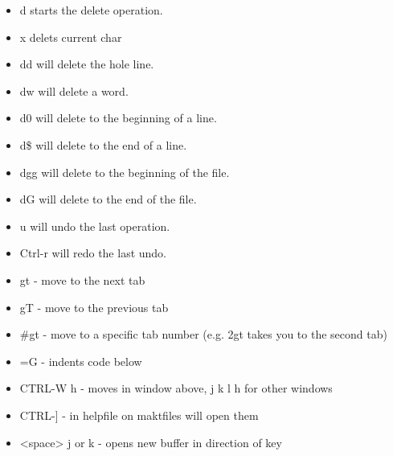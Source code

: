 \documentclass[12pt]{article}
\begin{document}
\begin{itemize}
    \item d starts the delete operation.
    \item x delets current char
    \item dd will delete the hole line.
    \item dw will delete a word.
    \item d0 will delete to the beginning of a line.
    \item d\$ will delete to the end of a line.
    \item dgg will delete to the beginning of the file.
    \item dG will delete to the end of the file.
    \item u will undo the last operation.
    \item Ctrl-r will redo the last undo. \\
    \item gt - move to the next tab
    \item gT - move to the previous tab
    \item \#gt - move to a specific tab number (e.g. 2gt takes you to the second tab)
    \item =G - indents code below
    \item CTRL-W h - moves in window above, j k l h for other windows
    \item CTRL-] - in helpfile on maktfiles will open them
    \item <space> j or k - opens new buffer in direction of key 
\end{itemize}
\end{document}
